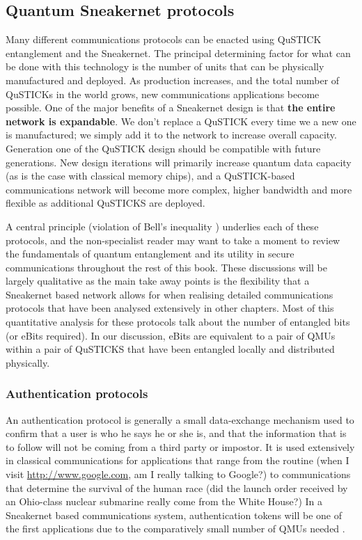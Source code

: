\documentclass[twocolumn, aps, rmp, amsmath, amssymb, nofootinbib, superscriptaddress, longbibliography, floatfix, table-of-contents, eqsecnum]{revtex4-2}
\begin{document}
\subsection{Quantum Sneakernet protocols}

Many different communications protocols can be enacted using QuSTICK entanglement and the Sneakernet. The principal determining factor for what can be done with this technology is the number of units that can be physically manufactured and deployed. As production increases, and the total number of QuSTICKs in the world grows, new communications applications become possible. One of the major benefits of a Sneakernet design is that \textbf{the entire network is expandable}. We don't replace a QuSTICK every time we a new one is manufactured; we simply add it to the network to increase overall capacity. Generation one of the QuSTICK design should be compatible with future generations. New design iterations will primarily increase quantum data capacity (as is the case with classical memory chips), and a QuSTICK-based communications network will become more complex, higher bandwidth and more flexible as additional QuSTICKS are deployed. 

A central principle (violation of Bell's inequality \cite{SD-Clauser:1969aa}) underlies each of these protocols, and the non-specialist reader may want to take a moment to review the fundamentals of quantum entanglement and its utility in secure communications throughout the rest of this book. These discussions will be largely qualitative as the main take away points is the flexibility that a Sneakernet based network allows for when realising detailed communications protocols that have been analysed extensively in other chapters. Most of this quantitative analysis for these protocols talk about the number of entangled bits (or eBits required). In our discussion, eBits are equivalent to a pair of QMUs within a pair of QuSTICKS that have been entangled locally and distributed physically. 

\subsubsection{Authentication protocols}

An authentication protocol is generally a small data-exchange mechanism used to confirm that a user is who he says he or she is, and that the information that is to follow will not be coming from a third party or impostor. It is used extensively in classical communications for applications that range from the routine (when I visit \href{href://www.google.com}{http://www.google.com}, am I really talking to Google?) to communications that determine the survival of the human race (did the launch order received by an Ohio-class nuclear submarine really come from the White House?) In a Sneakernet based communications system, authentication tokens will be one of the first applications due to the comparatively small number of QMUs needed \cite{SD-Curty:2001aa}. 
\end{document}
